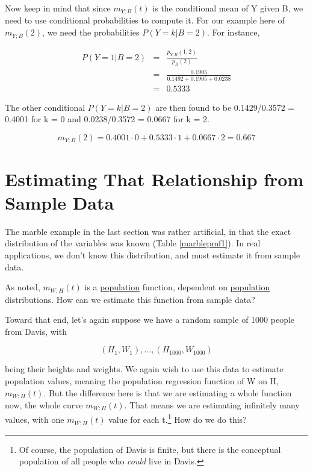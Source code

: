 Now keep in mind that since $m_{Y;B}(t)$ is the conditional mean of Y
given B, we need to use conditional probabilities to compute it.  For
our example here of $m_{Y;B}(2)$, we need the probabilities $P(Y = k | B
= 2)$.  For instance,

\begin{eqnarray}
P( Y = 1 | B = 2) &=& \frac{p_{Y,B}(1,2)}{p_B(2)} \\ 
&=& \frac{0.1905}{0.1492 + 0.1905 + 0.0238} \\
&=& 0.5333
\end{eqnarray}

The other conditional $P(Y = k | B = 2)$ are then found to be 
0.1429/0.3572 = 0.4001 for k = 0 and
0.0238/0.3572 = 0.0667 for k = 2. 

\begin{equation}
m_{Y;B}(2) = 0.4001 \cdot 0 + 0.5333 \cdot 1 + 0.0667 \cdot 2 = 0.667
\end{equation}

\section{Estimating That Relationship from Sample Data}
\label{estfromsample}

The marble example in the last section was rather artificial, in that
the exact distribution of the variables was known (Table
\ref{marblepmf1}).  In real applications, we don't know this
distribution, and must estimate it from sample data.

As noted, $m_{W;H}(t)$ is a \underline{population} function,
dependent on \underline{population} distributions.  How can we estimate
this function from sample data?

Toward that end, let's again suppose we have a random sample of 1000
people from Davis, with 

\begin{equation}
(H_1,W_1),...,(H_{1000},W_{1000})
\end{equation}

being their heights and weights.  We again wish to use this data to
estimate population values, meaning the population regression function
of W on H, $m_{W;H}(t)$.  But the difference here is that we are
estimating a whole function now, the whole curve $m_{W;H}(t)$.  That
means we are estimating infinitely many values, with one $m_{W;H}(t)$
value for each t.\footnote{Of course, the population of Davis is finite,
but there is the conceptual population of all people who {\it could}
live in Davis.} How do we do this?

